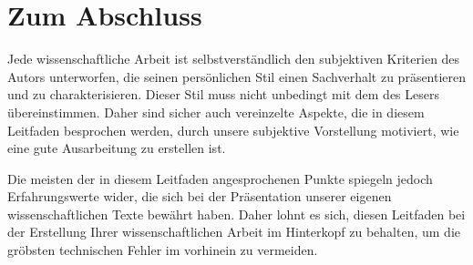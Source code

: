 \chapter{Zum Abschluss}

Jede wissenschaftliche Arbeit ist selbstverständlich den subjektiven
Kriterien des Autors unterworfen, die seinen persönlichen Stil einen
Sachverhalt zu präsentieren und zu charakterisieren. 
Dieser Stil muss nicht unbedingt mit dem des Lesers
übereinstimmen. Daher sind sicher auch vereinzelte Aspekte, die in
diesem Leitfaden besprochen werden, durch unsere subjektive
Vorstellung motiviert, wie eine gute Ausarbeitung zu erstellen ist.

Die meisten der in diesem Leitfaden angesprochenen Punkte spiegeln
jedoch  Erfahrungswerte wider, die sich
bei der Präsentation unserer eigenen wissenschaftlichen Texte bewährt
haben. Daher lohnt es sich, diesen Leitfaden bei der Erstellung Ihrer
wissenschaftlichen Arbeit im Hinterkopf zu behalten, um die gröbsten
technischen Fehler im vorhinein zu vermeiden.
